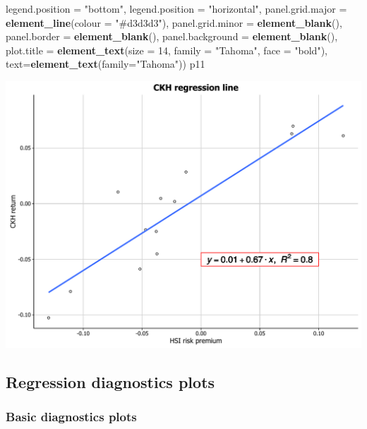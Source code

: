 \documentclass[]{article}
\newenvironment{Shaded}{\begin{snugshade}}{\end{snugshade}}
\newcommand{\KeywordTok}[1]{\textcolor[rgb]{0.13,0.29,0.53}{\textbf{{#1}}}}
\newcommand{\DataTypeTok}[1]{\textcolor[rgb]{0.13,0.29,0.53}{{#1}}}
\newcommand{\DecValTok}[1]{\textcolor[rgb]{0.00,0.00,0.81}{{#1}}}
\newcommand{\StringTok}[1]{\textcolor[rgb]{0.31,0.60,0.02}{{#1}}}
\newcommand{\NormalTok}[1]{{#1}}
\begin{document}
\begin{Shaded}
\begin{Highlighting}[]
            \DataTypeTok{legend.position =} \StringTok{"bottom"}\NormalTok{, }\DataTypeTok{legend.position =} \StringTok{"horizontal"}\NormalTok{,}
            \DataTypeTok{panel.grid.major =} \KeywordTok{element_line}\NormalTok{(}\DataTypeTok{colour =} \StringTok{"#d3d3d3"}\NormalTok{), }
            \DataTypeTok{panel.grid.minor =} \KeywordTok{element_blank}\NormalTok{(), }
            \DataTypeTok{panel.border =} \KeywordTok{element_blank}\NormalTok{(), }\DataTypeTok{panel.background =} \KeywordTok{element_blank}\NormalTok{(),}
            \DataTypeTok{plot.title =} \KeywordTok{element_text}\NormalTok{(}\DataTypeTok{size =} \DecValTok{14}\NormalTok{, }\DataTypeTok{family =} \StringTok{"Tahoma"}\NormalTok{, }\DataTypeTok{face =} \StringTok{"bold"}\NormalTok{),}
            \DataTypeTok{text=}\KeywordTok{element_text}\NormalTok{(}\DataTypeTok{family=}\StringTok{"Tahoma"}\NormalTok{))}
\NormalTok{p11}
\end{Highlighting}
\end{Shaded}

\begin{center}\includegraphics{0_all_posts_pdf/lr_17-1} \end{center}

\subsection{Regression diagnostics
plots}\label{regression-diagnostics-plots}

\subsubsection{Basic diagnostics plots}\label{basic-diagnostics-plots}
\end{document}
